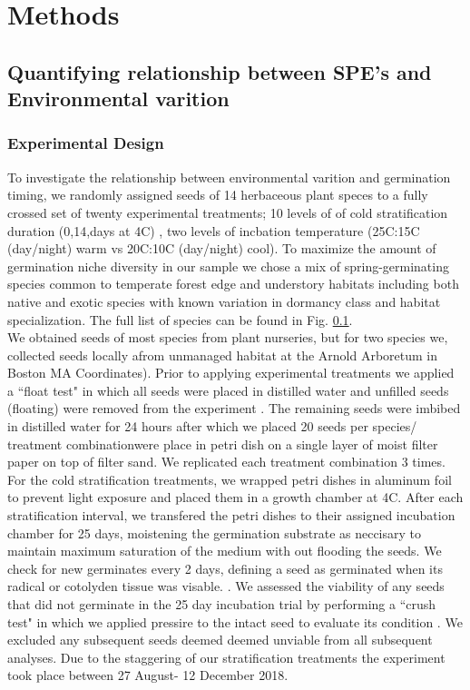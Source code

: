 \documentclass[11pt]{article}\usepackage[]{graphicx}\usepackage[]{color}
\begin{document}
\section*{Methods}
\subsection{Quantifying relationship between SPE's and Environmental varition}
\subsubsection*{Experimental Design}
To investigate the relationship between environmental varition and germination timing, we randomly assigned seeds of 14 herbaceous plant speces to a  fully crossed set of twenty experimental treatments; 10 levels of of cold stratification duration (0,14,days at 4\degree C) , two levels of incbation temperature (25\degree C:15\degree C (day/night) warm vs 20\degree C:10\degree C (day/night) cool). To maximize the amount of germination niche diversity in our sample we chose a mix of spring-germinating species common to temperate forest edge and understory habitats including both native and exotic species with known variation in dormancy class and habitat specialization. The full list of species can be found in Fig. \ref{}.\\
\noindent  We obtained seeds of most species from plant nurseries, but for two species we, collected seeds locally afrom unmanaged habitat at the Arnold Arboretum in Boston MA Coordinates). Prior to applying experimental treatments we applied a ``float test" in which all seeds were placed in distilled water and unfilled seeds (floating) were removed from the experiment \citep{}. The remaining seeds were imbibed in distilled water for 24 hours after which we placed  20 seeds per species/ treatment combinationwere place in petri dish on a single layer of moist filter paper on top of filter sand. We replicated each treatment combination 3 times. For the cold stratification treatments, we wrapped petri dishes in aluminum foil to prevent light exposure and placed them in a growth chamber at 4\degree C. After each stratification interval, we transfered the petri dishes to their assigned incubation chamber for 25 days, moistening the germination substrate as neccisary to maintain maximum saturation of the medium with out flooding the seeds. We check for new germinates every 2 days, defining a seed as germinated when its radical or cotolyden tissue was visable.  \citep{}. We assessed the viability of any seeds that did not germinate in the 25 day incubation trial by performing a ``crush test" in which we applied pressire to the intact seed to evaluate its condition \citepP{}. We excluded any subsequent seeds deemed deemed unviable from all subsequent analyses. Due to the staggering of our stratification treatments the experiment took place between 27 August- 12 December 2018.\\
\end{document}
